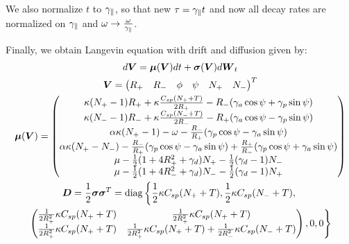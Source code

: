 \documentclass[12pt, notitlepage]{report}
\begin{document}
	We also normalize $t$ to $\gamma_{\parallel}$, so that new $\tau = \gamma_{\parallel} t$ and now all decay rates are normalized on $\gamma_{\parallel}$ and $\omega \rightarrow \frac{\omega}{\gamma_{\parallel}}$.
	
	Finally, we obtain Langevin equation with drift and diffusion given by:
	\begin{gather}
		d\boldsymbol{V} = \boldsymbol{\mu}(\boldsymbol{V}) dt + \boldsymbol{\sigma}(\boldsymbol{V})d\boldsymbol{W}_t \\
		\boldsymbol{V} = \begin{pmatrix}
			R_+ & R_- & \phi & \psi & N_+ & N_-
		\end{pmatrix}^T \\
		\boldsymbol{\mu}(\boldsymbol{V}) = \begin{pmatrix}
			\kappa (N_+ - 1) R_+ + \kappa\frac{C_{sp}(N_+ + T)}{2R_+} - R_- (\gamma_a \cos \psi + \gamma_p\sin\psi) \\
			\kappa (N_- - 1) R_- + \kappa\frac{C_{sp}(N_- + T)}{2R_-} - R_+ (\gamma_a \cos \psi - \gamma_p\sin\psi) \\
			\alpha\kappa(N_+ - 1) - \omega - \frac{R_-}{R_+}(\gamma_p\cos\psi - \gamma_a\sin\psi) \\
			\alpha\kappa (N_+ - N_-) - \frac{R_-}{R_+}(\gamma_p\cos\psi - \gamma_a\sin\psi) + \frac{R_+}{R_-}(\gamma_p\cos\psi + \gamma_a\sin\psi) \\
			\mu -\frac{1}{2}(1+4R_+^2 + \gamma_d)N_+ - \frac{1}{2}(\gamma_d - 1)N_- \\
			\mu -\frac{1}{2}(1+4R_-^2 + \gamma_d)N_- - \frac{1}{2}(\gamma_d - 1)N_+ 
		\end{pmatrix} \\
	\boldsymbol{D} = \frac{1}{2}\boldsymbol{\sigma}\boldsymbol{\sigma}^T = \text{diag}\left\{ \frac{1}{2}\kappa C_{sp}(N_+ + T),\frac{1}{2}\kappa C_{sp}(N_- + T), \right.\\ \left. \begin{pmatrix}
		\frac{1}{2 R_+^2}\kappa C_{sp} (N_+ + T) & \frac{1}{2 R_+^2}\kappa C_{sp} (N_+ + T) \\
		\frac{1}{2 R_+^2}\kappa C_{sp} (N_+ + T) & \frac{1}{2 R_+^2}\kappa C_{sp} (N_+ + T) + \frac{1}{2 R_-^2}\kappa C_{sp} (N_- + T)
	\end{pmatrix}, 0, 0 \right\} 
	\end{gather}
	
\end{document}
